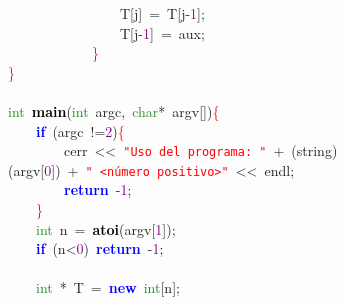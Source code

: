 \mbox{}\ \ \ \ \ \ \ \ \ \ \ \ \ \ \ \ T\textcolor{BrickRed}{[}j\textcolor{BrickRed}{]}\ \textcolor{BrickRed}{=}\ T\textcolor{BrickRed}{[}j\textcolor{BrickRed}{-}\textcolor{Purple}{1}\textcolor{BrickRed}{];} \\
\mbox{}\ \ \ \ \ \ \ \ \ \ \ \ \ \ \ \ T\textcolor{BrickRed}{[}j\textcolor{BrickRed}{-}\textcolor{Purple}{1}\textcolor{BrickRed}{]}\ \textcolor{BrickRed}{=}\ aux\textcolor{BrickRed}{;} \\
\mbox{}\ \ \ \ \ \ \ \ \ \ \ \ \textcolor{Red}{\}} \\
\mbox{}\textcolor{Red}{\}} \\
\mbox{} \\
\mbox{}\textcolor{ForestGreen}{int}\ \textbf{\textcolor{Black}{main}}\textcolor{BrickRed}{(}\textcolor{ForestGreen}{int}\ argc\textcolor{BrickRed}{,}\ \textcolor{ForestGreen}{char}\textcolor{BrickRed}{*}\ argv\textcolor{BrickRed}{[])}\textcolor{Red}{\{} \\
\mbox{}\ \ \ \ \textbf{\textcolor{Blue}{if}}\ \textcolor{BrickRed}{(}argc\ \textcolor{BrickRed}{!=}\textcolor{Purple}{2}\textcolor{BrickRed}{)}\textcolor{Red}{\{} \\
\mbox{}\ \ \ \ \ \ \ \ cerr\ \textcolor{BrickRed}{\textless{}\textless{}}\ \texttt{\textcolor{Red}{"{}Uso\ del\ programa:\ "{}}}\ \textcolor{BrickRed}{+}\ \textcolor{BrickRed}{(}string\textcolor{BrickRed}{)(}argv\textcolor{BrickRed}{[}\textcolor{Purple}{0}\textcolor{BrickRed}{])}\ \textcolor{BrickRed}{+}\ \texttt{\textcolor{Red}{"{}\ \textless{}número\ positivo\textgreater{}"{}}}\ \textcolor{BrickRed}{\textless{}\textless{}}\ endl\textcolor{BrickRed}{;}\ \  \\
\mbox{}\ \ \ \ \ \ \ \ \textbf{\textcolor{Blue}{return}}\ \textcolor{BrickRed}{-}\textcolor{Purple}{1}\textcolor{BrickRed}{;} \\
\mbox{}\ \ \ \ \textcolor{Red}{\}} \\
\mbox{}\ \ \ \ \textcolor{ForestGreen}{int}\ n\ \textcolor{BrickRed}{=}\ \textbf{\textcolor{Black}{atoi}}\textcolor{BrickRed}{(}argv\textcolor{BrickRed}{[}\textcolor{Purple}{1}\textcolor{BrickRed}{]);}\ \ \ \  \\
\mbox{}\ \ \ \ \textbf{\textcolor{Blue}{if}}\ \textcolor{BrickRed}{(}n\textcolor{BrickRed}{\textless{}}\textcolor{Purple}{0}\textcolor{BrickRed}{)}\ \textbf{\textcolor{Blue}{return}}\ \textcolor{BrickRed}{-}\textcolor{Purple}{1}\textcolor{BrickRed}{;} \\
\mbox{}\ \ \ \  \\
\mbox{}\ \ \ \ \textcolor{ForestGreen}{int}\ \textcolor{BrickRed}{*}\ T\ \textcolor{BrickRed}{=}\ \textbf{\textcolor{Blue}{new}}\ \textcolor{ForestGreen}{int}\textcolor{BrickRed}{[}n\textcolor{BrickRed}{];} \\
